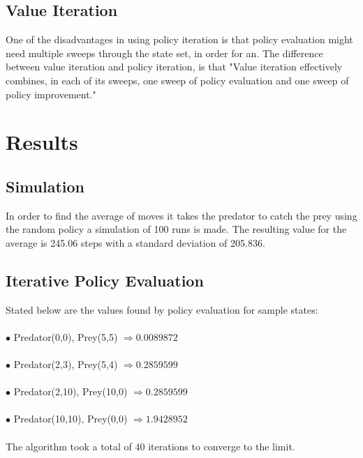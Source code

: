 \documentclass[11pt]{article}
\begin{document}
\subsection{Value Iteration}
One of the disadvantages in using policy iteration is that policy evaluation might need multiple sweeps through the state set, in order for an. The difference between value iteration and policy iteration, is that "Value iteration effectively combines, in each of its sweeps, one sweep of policy evaluation and one sweep of policy improvement." \cite{3}\\



\section{Results\\}


\subsection{Simulation}
In order to find the average of moves it takes the predator to catch the prey using the random policy a simulation of 100 runs is made. The resulting value for the average is 245.06 steps with a standard deviation of 205.836.\\



\subsection{Iterative Policy Evaluation}


Stated below are the values found by policy evaluation for sample states:\\\\
$\bullet$ Predator(0,0), Prey(5,5) $\Rightarrow 0.0089872$\\\\
$\bullet$ Predator(2,3), Prey(5,4) $\Rightarrow  0.2859599$\\\\
$\bullet$ Predator(2,10), Prey(10,0) $\Rightarrow  0.2859599$\\\\
$\bullet$ Predator(10,10), Prey(0,0) $\Rightarrow  1.9428952$\\\\
The algorithm took a total of 40 iterations to converge to the limit.\\

\pagebreak
\end{document}
